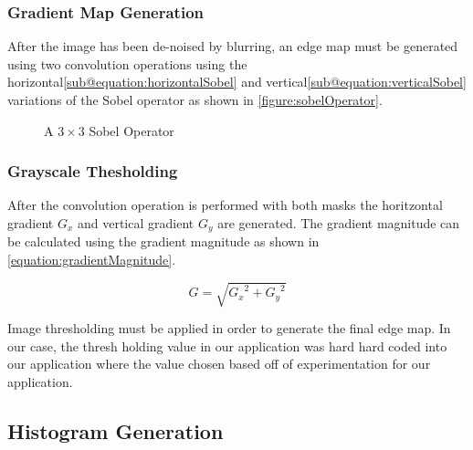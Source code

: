 \documentclass[conference]{IEEEtran}
\begin{document}
\subsubsection{Gradient Map Generation}
After the image has been de-noised by blurring, an edge map must be generated using two convolution operations using the horizontal\ref*{sub@equation:horizontalSobel} and  vertical\ref*{sub@equation:verticalSobel} variations of the Sobel operator as shown in \autoref{figure:sobelOperator}.
\begin{figure}[h] %
  \centering
  \hfil
  \caption{A $3 \times 3$ Sobel Operator}\label{figure:sobelOperator}
\end{figure}

\subsubsection{Grayscale Thesholding}
After the convolution operation is performed with both masks the horitzontal gradient $G_x$ and vertical gradient $G_y$ are generated. 
The gradient magnitude can be calculated using the gradient magnitude as shown in \autoref{equation:gradientMagnitude}.

\begin{equation}
  G = \sqrt{{G_x}^2 + {G_y}^2}\label{equation:gradientMagnitude}
\end{equation}

Image thresholding must be applied in order to generate the final edge map.
In our case, the thresh holding value in our application was hard hard coded into our application where the value chosen based off of experimentation for our application.


\subsection{Histogram Generation}
\end{document}
